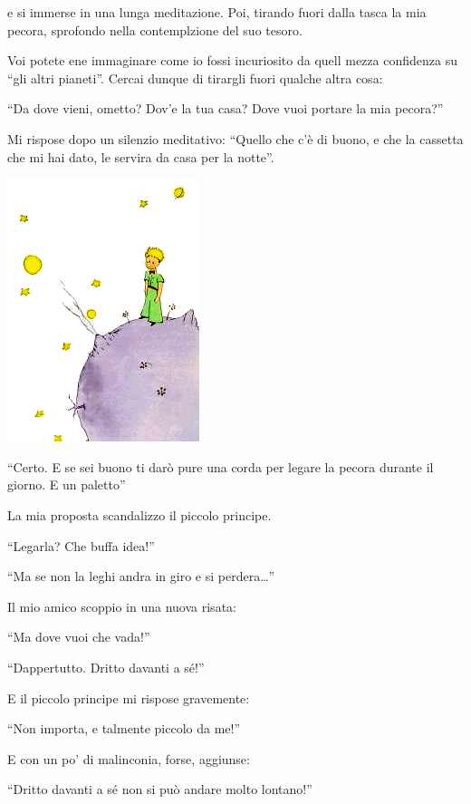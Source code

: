 \documentclass[11pt]{scrbook}
\begin{document}
e si immerse in una lunga meditazione. Poi, tirando fuori dalla tasca la
mia pecora, sprofondo nella contemplzione del suo tesoro.

Voi potete ene immaginare come io fossi incuriosito da quell mezza
confidenza su ``gli altri pianeti''. Cercai dunque di tirargli fuori
qualche altra cosa:

``Da dove vieni, ometto? Dov'e la tua casa? Dove vuoi portare la mia
pecora?''

Mi rispose dopo un silenzio meditativo: ``Quello che c'è di buono, e che
la cassetta che mi hai dato, le servira da casa per la notte''.

\begin{center}
\includegraphics{img/estrellas}

\end{center}

``Certo. E se sei buono ti darò pure una corda per legare la pecora
durante il giorno. E un paletto''

La mia proposta scandalizzo il piccolo principe.

``Legarla? Che buffa idea!''

``Ma se non la leghi andra in giro e si perdera\ldots{}''

Il mio amico scoppio in una nuova risata:

``Ma dove vuoi che vada!''

``Dappertutto. Dritto davanti a sé!''

E il piccolo principe mi rispose gravemente:

``Non importa, e talmente piccolo da me!''

E con un po' di malinconia, forse, aggiunse:

``Dritto davanti a sé non si può andare molto lontano!''
\end{document}
